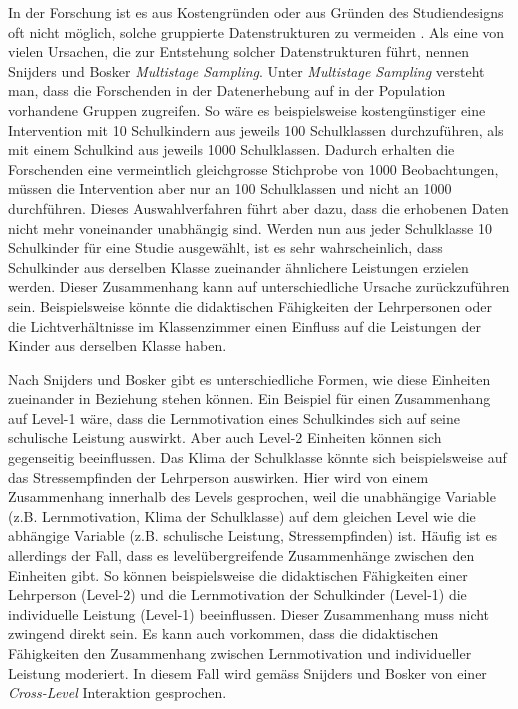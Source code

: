 \documentclass[12pt]{article}\usepackage[]{graphicx}\usepackage[]{color}
\begin{document}
In der Forschung ist es aus Kostengründen oder aus Gründen des Studiendesigns oft nicht möglich, solche gruppierte Datenstrukturen zu vermeiden \citep{SnijdersTomA.B2012Ma:a, woltman2012introduction}. Als eine von vielen Ursachen, die zur Entstehung solcher Datenstrukturen führt, nennen Snijders und Bosker \citeyearpar{SnijdersTomA.B2012Ma:a} \textit{Multistage Sampling}. Unter \textit{Multistage Sampling} versteht man, dass die Forschenden in der Datenerhebung auf in der Population vorhandene Gruppen zugreifen. So wäre es beispielsweise kostengünstiger eine Intervention mit 10 Schulkindern aus jeweils 100 Schulklassen durchzuführen, als mit einem Schulkind aus jeweils 1000 Schulklassen. Dadurch erhalten die Forschenden eine vermeintlich gleichgrosse Stichprobe von 1000 Beobachtungen, müssen die Intervention aber nur an 100 Schulklassen und nicht an 1000 durchführen. Dieses Auswahlverfahren führt aber dazu, dass die erhobenen Daten nicht mehr voneinander unabhängig sind. Werden nun aus jeder Schulklasse 10 Schulkinder für eine Studie ausgewählt, ist es sehr wahrscheinlich, dass Schulkinder aus derselben Klasse zueinander ähnlichere Leistungen erzielen werden. Dieser Zusammenhang kann auf unterschiedliche Ursache zurückzuführen sein. Beispielsweise könnte die didaktischen Fähigkeiten der Lehrpersonen oder die Lichtverhältnisse im Klassenzimmer einen Einfluss auf die Leistungen der Kinder aus derselben Klasse haben. 

Nach Snijders und Bosker \citeyearpar{SnijdersTomA.B2012Ma:a} gibt es unterschiedliche Formen, wie diese Einheiten zueinander in Beziehung stehen können. Ein Beispiel für einen Zusammenhang auf Level-1 wäre, dass die Lernmotivation eines Schulkindes sich auf seine schulische Leistung auswirkt. Aber auch Level-2 Einheiten können sich gegenseitig beeinflussen. Das Klima der Schulklasse könnte sich beispielsweise auf das Stressempfinden der Lehrperson auswirken. Hier wird von einem Zusammenhang innerhalb des Levels gesprochen, weil die unabhängige Variable (z.B. Lernmotivation, Klima der Schulklasse) auf dem gleichen Level wie die abhängige Variable (z.B. schulische Leistung, Stressempfinden) ist. Häufig ist es allerdings der Fall, dass es levelübergreifende Zusammenhänge zwischen den Einheiten gibt. So können beispielsweise die didaktischen Fähigkeiten einer Lehrperson (Level-2) und die Lernmotivation der Schulkinder (Level-1) die individuelle Leistung (Level-1) beeinflussen. Dieser Zusammenhang muss nicht zwingend direkt sein. Es kann auch vorkommen, dass die didaktischen Fähigkeiten den Zusammenhang zwischen Lernmotivation und individueller Leistung moderiert. In diesem Fall wird gemäss Snijders und Bosker \citeyearpar{SnijdersTomA.B2012Ma:a} von einer \textit{Cross-Level} Interaktion gesprochen.
\end{document}
